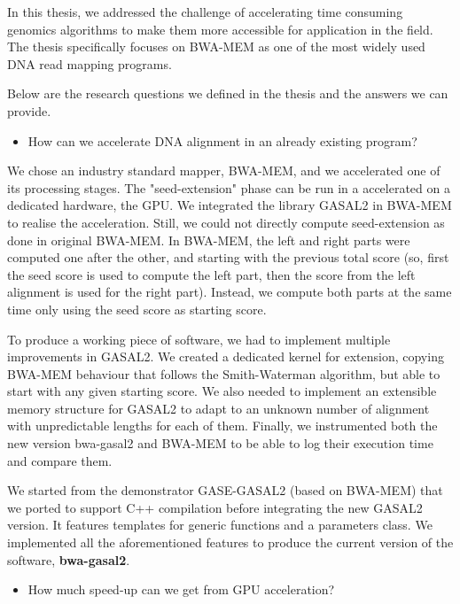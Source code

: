 

In this thesis, we addressed the challenge of accelerating time consuming genomics algorithms to make them more accessible for application in the field. The thesis specifically focuses on BWA-MEM as one of the most widely used DNA read mapping programs. 

Below are the research questions we defined in the thesis and the answers we can provide.

\begin{itemize}
	\item How can we accelerate DNA alignment in an already existing program?
\end{itemize}	

We chose an industry standard mapper, BWA-MEM, and we accelerated one of its processing stages. The "seed-extension" phase can be run in a accelerated on a dedicated hardware, the GPU. We integrated the library GASAL2 in BWA-MEM to realise the acceleration. Still, we could not directly compute seed-extension as done in original BWA-MEM. In BWA-MEM, the left and right parts were computed one after the other, and starting with the previous total score (so, first the seed score is used to compute the left part, then the score from the left alignment is used for the right part). Instead, we compute both parts at the same time only using the seed score as starting score.

To produce a working piece of software, we had to implement multiple improvements in GASAL2. We created a dedicated kernel for extension, copying BWA-MEM behaviour that follows the Smith-Waterman algorithm, but able to start with any given starting score. We also needed to implement an extensible memory structure for GASAL2 to adapt to an unknown number of alignment with unpredictable lengths for each of them. Finally, we instrumented both the new version bwa-gasal2 and BWA-MEM to be able to log their execution time and compare them. 

We started from the demonstrator GASE-GASAL2 (based on BWA-MEM) that we ported to support C++ compilation before integrating the new GASAL2 version. It features templates for generic functions and a parameters class. We implemented all the aforementioned features to produce the current version of the software, \textbf{bwa-gasal2}.

\begin{itemize}
	\item How much speed-up can we get from GPU acceleration?
\end{itemize}

